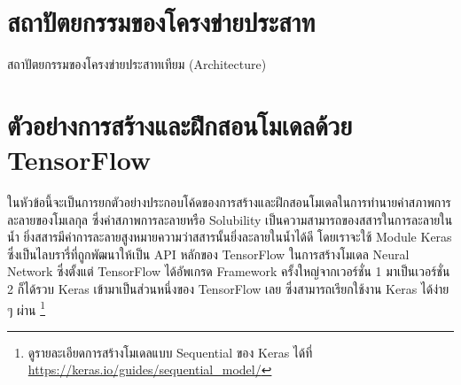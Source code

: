 \section{สถาปัตยกรรมของโครงข่ายประสาท}
\label{sec:arch_nn}

สถาปัตยกรรมของโครงข่ายประสาทเทียม (Architecture)

\section{ตัวอย่างการสร้างและฝึกสอนโมเดลด้วย TensorFlow}
\label{sec:train_tf}

ในหัวข้อนี้จะเป็นการยกตัวอย่างประกอบโค้ดของการสร้างและฝึกสอนโมเดลในการทำนายค่าสภาพการละลายของโมเลกุล ซึ่งค่าสภาพการละลายหรือ
Solubility เป็นความสามารถของสสารในการละลายในน้ำ ยิ่งสสารมีค่าการละลายสูงหมายความว่าสสารนั้นยิ่งละลายในน้ำได้ดี โดยเราจะใช้ Module 
Keras ซึ่งเป็นไลบรารี่ที่ถูกพัฒนาให้เป็น API หลักของ TensorFlow ในการสร้างโมเดล Neural Network ซึ่งตั้งแต่ TensorFlow ได้อัพเกรด 
Framework ครั้งใหญ่จากเวอร์ชั่น 1 มาเป็นเวอร์ชั่น 2 ก็ได้รวบ Keras เข้ามาเป็นส่วนหนึ่งของ TensorFlow เลย ซึ่งสามารถเรียกใช้งาน Keras 
ได้ง่าย ๆ ผ่าน \footnote{ดูรายละเอียดการสร้างโมเดลแบบ Sequential ของ Keras ได้ที่ 
\url{https://keras.io/guides/sequential_model/}}

